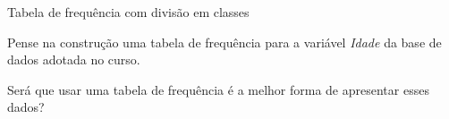 
    
    

\begin{frame}{Tabela de frequência com divisão em classes} 
   \begin{exemplo}
        Pense na construção uma tabela de frequência para a variável \textit{Idade} da base de dados adotada no curso.
    \end{exemplo}

    Será que usar uma tabela de frequência é a melhor forma de apresentar esses dados?
\end{frame}

